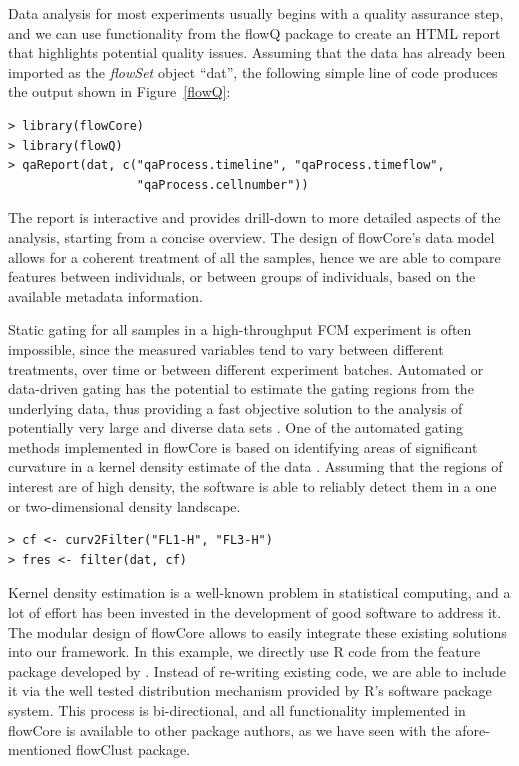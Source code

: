\documentclass[12pt]{article}
\newcommand{\Rpackage}[1]{{\textsf{#1}}}
\newcommand{\Rclass}[1]{{\textit{#1}}}
\begin{document}
Data analysis for most experiments usually begins with a quality
assurance step, and we can use functionality from the \Rpackage{flowQ}
package to create an HTML report that highlights potential quality
issues. Assuming that the data has already been imported as the
\Rclass{flowSet} object ``dat'', the following simple line of code
produces the output shown in Figure~\ref{flowQ}:

\begin{verbatim}
> library(flowCore)
> library(flowQ)
> qaReport(dat, c("qaProcess.timeline", "qaProcess.timeflow", 
                  "qaProcess.cellnumber"))
\end{verbatim}

The report is interactive and provides drill-down to more detailed
aspects of the analysis, starting from a concise overview. The design of \Rpackage{flowCore}'s data model
allows for a coherent treatment of all the samples, hence we are able
to compare features between individuals, or between groups of
individuals, based on the available metadata information.


Static gating for all samples in a high-throughput FCM experiment is
often impossible, since the measured variables tend to vary between
different treatments, over time or between different experiment
batches. Automated or data-driven gating has the potential to estimate
the gating regions from the underlying data, thus providing a fast
objective solution to the analysis of potentially very large and
diverse data sets \citep{lo2008agf}. One of the automated gating
methods implemented in \Rpackage{flowCore} is based on identifying
areas of significant curvature in a kernel density estimate of the
data \citep{wand2008}. Assuming that the regions of interest are of
high density, the software is able to reliably detect them in a one or
two-dimensional density landscape.

\begin{verbatim}
> cf <- curv2Filter("FL1-H", "FL3-H")
> fres <- filter(dat, cf)
\end{verbatim}

Kernel density estimation is a well-known problem in statistical
computing, and a lot of effort has been invested in the development of
good software to address it. The modular design of \Rpackage{flowCore}
allows to easily integrate these existing solutions into our
framework. In this example, we directly use R code from the
\Rpackage{feature} package developed by \cite{wand2008}. Instead of
re-writing existing code, we are able to include it via the well
tested distribution mechanism provided by R's software package
system. This process is bi-directional, and all functionality
implemented in \Rpackage{flowCore} is available to other package
authors, as we have seen with the afore-mentioned \Rpackage{flowClust}
package.
\end{document}
